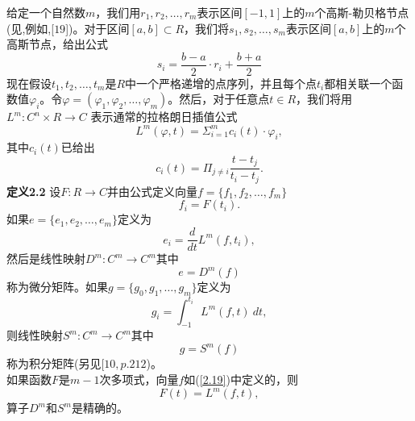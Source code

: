 \documentclass[12pt,a4paper]{article}
\begin{document}
给定一个自然数$m$，我们用$r_1, r_2,\ldots,r_m$表示区间$[-1,1]$上的$m$个高斯-勒贝格节点(见,例如,[$19$])。对于区间$[a,b]\subset R$，我们将$s_1,s_2,\ldots,s_m$表示区间$[a, b]$上的$m$个高斯节点，给出公式\\
\begin{equation}
s_i=\frac{b-a}{2} \cdot r_i +\frac{b+a}{2}
\end{equation}
现在假设$t_1,t_2,\ldots,t_m$是$R$中一个严格递增的点序列，并且每个点$t_i$都相关联一个函数值$\varphi_i$。令$\varphi=(\varphi_1,\varphi_2,\ldots,\varphi_m)$。然后，对于任意点$t \in R$，我们将用$L^m:C^n \times R\rightarrow C$ 表示通常的拉格朗日插值公式\\
\begin{equation}
L^m(\varphi,t)=\Sigma_{i=1}^{m}c_i(t) \cdot \varphi_i,
\end{equation}
其中$c_i(t)$已给出\\
\begin{equation}
c_i(t)=\Pi_{j\neq i} \frac{t-t_j}{t_i-t_j}.
\end{equation}
\textbf{定义2.2} 设$F:R\rightarrow C$并由公式定义向量$f=\{f_1,f_2,\ldots,f_m\}$\\
\begin{equation}
\label{2.19}
f_i=F(t_i).
\end{equation}
如果$e = \{e_1,e_2,\ldots,e_m\}$定义为\\
\begin{equation}
e_i=\frac{d}{dt}L^m(f,t_i),
\end{equation}
然后是线性映射$D^m:C^m\rightarrow C^m$其中\\
\begin{equation}
e=D^m(f)
\label{2.21}
\end{equation}
称为微分矩阵。如果$g = \{g_0, g_1,\ldots,g_m\}$定义为\\
\begin{equation}
g_i= \int _{-1}^{t_i} L^m(f,t)~dt,
\end{equation}
则线性映射$S^m:C^m\rightarrow C^m$其中\\
\begin{equation}
g=S^m(f)
\label{2.23}
\end{equation}
称为积分矩阵(另见[$10,p.212$)。\\

如果函数$F$是$m-1$次多项式，向量$f$如(\ref{2.19})中定义的，则\\
\begin{equation}
F(t)=L^m(f,t),
\end{equation}
算子$D^m$和$S^m$是精确的。\\
\end{document}
